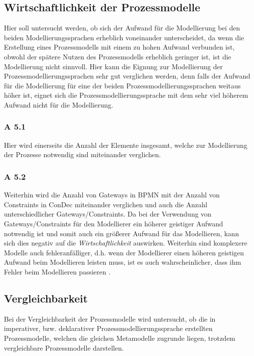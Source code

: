 \subsection{Wirtschaftlichkeit der Prozessmodelle}

Hier soll untersucht werden, ob sich der Aufwand für die Modellierung bei den beiden Modellierungssprachen erheblich voneinander unterscheidet, da wenn die Erstellung eines Prozessmodells mit einem zu hohen Aufwand verbunden ist, obwohl der spätere Nutzen des Prozessmodells erheblich geringer ist, ist die Modellierung nicht sinnvoll. Hier kann die Eignung zur Modellierung der Prozessmodellierungssprachen sehr gut verglichen werden, denn falls der Aufwand für die Modellierung für eine der beiden Prozessmodellierungssprachen weitaus höher ist, eignet sich die Prozessmodellierungssprache mit dem sehr viel höherem Aufwand nicht für die Modellierung.\newline

\subsubsection{A 5.1}
Hier wird einerseits die Anzahl der Elemente insgesamt, welche zur Modellierung der Prozesse notwendig sind miteinander verglichen.

\subsubsection{A 5.2}
 Weiterhin wird die Anzahl von Gateways in BPMN mit der Anzahl von Constraints in ConDec miteinander verglichen und auch die Anzahl unterschiedlicher Gateways/Constraints. Da bei der Verwendung von Gateways/Constraints für den Modellierer ein höherer geistiger Aufwand notwendig ist und somit auch ein größerer Aufwand für das Modellieren, kann sich dies negativ auf die \textit{Wirtschaftlichkeit} auswirken. Weiterhin sind komplexere Modelle auch fehleranfälliger, d.h. wenn der Modellierer einen höheren geistigen Aufwand beim Modellieren leisten muss, ist es auch wahrscheinlicher, dass ihm Fehler beim Modellieren passieren \cite{freund2007, journals95, leimeister2012,mendling2010seven}.


\subsection{Vergleichbarkeit}
Bei der Vergleichbarkeit der Prozessmodelle wird untersucht, ob die in imperativer, bzw. deklarativer Prozessmodellierungssprache erstellten Prozessmodelle, welchen die gleichen Metamodelle zugrunde liegen, trotzdem vergleichbare Prozessmodelle darstellen.

